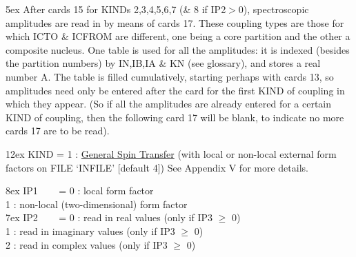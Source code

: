 \documentclass[11pt]{article}
\begin{document}
\hangindent 5ex
After cards 15 for KINDs 2,3,4,5,6,7 (\& 8 if IP2$>$0),
spectroscopic amplitudes are read in by means of cards 17.
These coupling types are those for which ICTO \& ICFROM are
different, one being a core partition and the other a composite
nucleus. One table is used for all the amplitudes: it is indexed
(besides the partition numbers) by IN,IB,IA \& KN (see glossary),
and stores a real number A.
The table is filled cumulatively,
starting perhaps with cards 13,
so amplitudes need only be
entered after the card for the first KIND of coupling in which
they appear.
(So if all the amplitudes are already entered for a certain KIND
of coupling, then the following card 17 will be blank, to indicate
no more cards 17 are to be read).

\bigskip

\hangindent 12ex
KIND = 1 :
\underline{General Spin Transfer}
(with local or non-local external form factors on FILE `INFILE' [default 4])
See Appendix V for more details.

\hangindent 8ex  IP1
~~~  = 0 : local form factor
\\   1 : non-local (two-dimensional) form factor
\\


\hangindent 7ex  IP2
~~~  = 0 : read in real values      (only if IP3 $\geq$ 0)
\\   1 : read in imaginary values    (only if IP3 $\geq$ 0)
\\   2 : read in complex values        (only if IP3 $\geq$ 0)
\\
\end{document}
